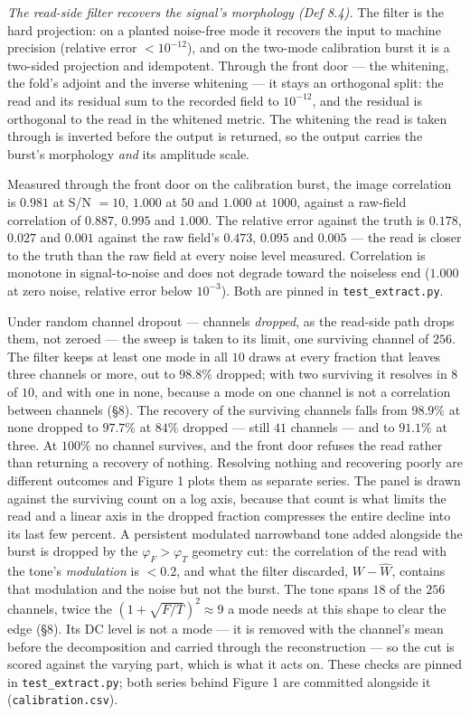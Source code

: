\documentclass[10pt,letterpaper,twocolumn]{article}
\begin{document}
\emph{The read-side filter recovers the signal's morphology (Def 8.4).} The filter is the hard projection: on a planted noise-free mode it recovers the input to machine precision (relative error \(<10^{-12}\)), and on the two-mode calibration burst it is a two-sided projection and idempotent. Through the front door --- the whitening, the fold's adjoint and the inverse whitening --- it stays an orthogonal split: the read and its residual sum to the recorded field to \(10^{-12}\), and the residual is orthogonal to the read in the whitened metric. The whitening the read is taken through is inverted before the output is returned, so the output carries the burst's morphology \emph{and} its amplitude scale.

Measured through the front door on the calibration burst, the image correlation is \(0.981\) at S/N \(=10\), \(1.000\) at \(50\) and \(1.000\) at \(1000\), against a raw-field correlation of \(0.887\), \(0.995\) and \(1.000\). The relative error against the truth is \(0.178\), \(0.027\) and \(0.001\) against the raw field's \(0.473\), \(0.095\) and \(0.005\) --- the read is closer to the truth than the raw field at every noise level measured. Correlation is monotone in signal-to-noise and does not degrade toward the noiseless end (\(1.000\) at zero noise, relative error below \(10^{-3}\)). Both are pinned in \texttt{test\_\allowbreak{}extract.\allowbreak{}py}.

Under random channel dropout --- channels \emph{dropped}, as the read-side path drops them, not zeroed --- the sweep is taken to its limit, one surviving channel of \(256\). The filter keeps at least one mode in all \(10\) draws at every fraction that leaves three channels or more, out to \(98.8\%\) dropped; with two surviving it resolves in \(8\) of \(10\), and with one in none, because a mode on one channel is not a correlation between channels (§8). The recovery of the surviving channels falls from \(98.9\%\) at none dropped to \(97.7\%\) at \(84\%\) dropped --- still \(41\) channels --- and to \(91.1\%\) at three. At \(100\%\) no channel survives, and the front door refuses the read rather than returning a recovery of nothing. Resolving nothing and recovering poorly are different outcomes and Figure 1 plots them as separate series. The panel is drawn against the surviving count on a log axis, because that count is what limits the read and a linear axis in the dropped fraction compresses the entire decline into its last few percent. A persistent modulated narrowband tone added alongside the burst is dropped by the \(\varphi_F>\varphi_T\) geometry cut: the correlation of the read with the tone's \emph{modulation} is \(<0.2\), and what the filter discarded, \(W-\widehat W\), contains that modulation and the noise but not the burst. The tone spans \(18\) of the \(256\) channels, twice the \((1+\sqrt{F/T})^2\approx9\) a mode needs at this shape to clear the edge (§8). Its DC level is not a mode --- it is removed with the channel's mean before the decomposition and carried through the reconstruction --- so the cut is scored against the varying part, which is what it acts on. These checks are pinned in \texttt{test\_\allowbreak{}extract.\allowbreak{}py}; both series behind Figure 1 are committed alongside it (\texttt{calibration.\allowbreak{}csv}).
\end{document}
